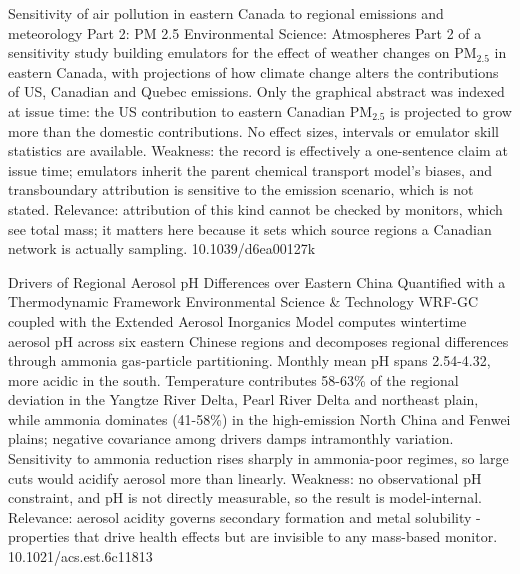 \documentclass[10pt]{article}
\begin{document}
{Sensitivity of air pollution in eastern Canada to regional emissions and meteorology Part 2: PM 2.5}
{Environmental Science: Atmospheres}
{Part 2 of a sensitivity study building emulators for the effect of weather changes on PM$_{2.5}$ in eastern Canada, with projections of how climate change alters the contributions of US, Canadian and Quebec emissions. Only the graphical abstract was indexed at issue time: the US contribution to eastern Canadian PM$_{2.5}$ is projected to grow more than the domestic contributions. No effect sizes, intervals or emulator skill statistics are available. Weakness: the record is effectively a one-sentence claim at issue time; emulators inherit the parent chemical transport model's biases, and transboundary attribution is sensitive to the emission scenario, which is not stated. Relevance: attribution of this kind cannot be checked by monitors, which see total mass; it matters here because it sets which source regions a Canadian network is actually sampling.}
{10.1039/d6ea00127k}

{Drivers of Regional Aerosol pH Differences over Eastern China Quantified with a Thermodynamic Framework}
{Environmental Science \& Technology}
{WRF-GC coupled with the Extended Aerosol Inorganics Model computes wintertime aerosol pH across six eastern Chinese regions and decomposes regional differences through ammonia gas-particle partitioning. Monthly mean pH spans 2.54-4.32, more acidic in the south. Temperature contributes 58-63\% of the regional deviation in the Yangtze River Delta, Pearl River Delta and northeast plain, while ammonia dominates (41-58\%) in the high-emission North China and Fenwei plains; negative covariance among drivers damps intramonthly variation. Sensitivity to ammonia reduction rises sharply in ammonia-poor regimes, so large cuts would acidify aerosol more than linearly. Weakness: no observational pH constraint, and pH is not directly measurable, so the result is model-internal. Relevance: aerosol acidity governs secondary formation and metal solubility - properties that drive health effects but are invisible to any mass-based monitor.}
{10.1021/acs.est.6c11813}

\par{}\baselineskip{}\baselineskip
{}
\end{document}
